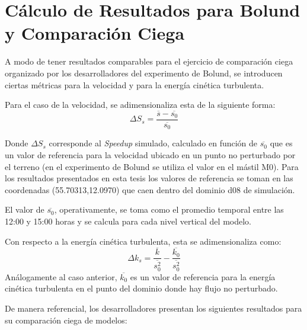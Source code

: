 \graphicspath{{./Imagenes/an1/}}
\chapter{Cálculo de Resultados para Bolund y Comparación Ciega}
A modo de tener resultados comparables para el ejercicio de comparación ciega organizado por los desarrolladores del experimento de Bolund, se introducen ciertas métricas para la velocidad y para la energía cinética turbulenta.

Para el caso de la velocidad, se adimensionaliza esta de la siguiente forma:
\begin{equation*}
\Delta S_s = \frac{\overline{s} - \overline{s_0}}{\overline{s_0}}
\end{equation*}

Donde $\Delta S_s$ corresponde al \emph{Speedup} simulado, calculado en función de $\overline{s_0}$ que es un valor de referencia para la velocidad ubicado en un punto no perturbado por el terreno (en el experimento de Bolund se utiliza el valor en el mástil M0). Para los resultados presentados en esta tesis los valores de referencia se toman en las coordenadas (55.70313,12.0970) que caen dentro del dominio d08 de simulación.

El valor de $\overline{s_0}$, operativamente, se toma como el promedio temporal entre las 12:00 y 15:00 horas y se calcula para cada nivel vertical del modelo.

Con respecto a la energía cinética turbulenta, esta se adimensionaliza como:
\begin{equation*}
\Delta k_s = \frac{\overline{k}}{\overline{s_0^2}} - \frac{\overline{k_0}}{\overline{s_0^2}}
\end{equation*}
Análogamente al caso anterior, $\overline{k_0}$ es un valor de referencia para la energía cinética turbulenta en el punto del dominio donde hay flujo no perturbado.

De manera referencial, los desarrolladores presentan los siguientes resultados para su comparación ciega de modelos:

